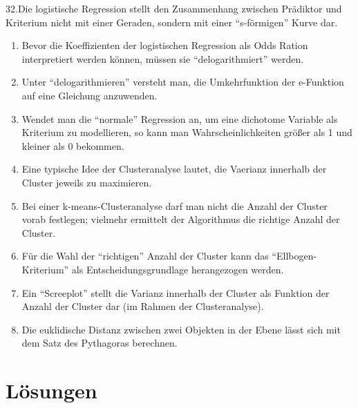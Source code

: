 \documentclass[12pt,ngerman,]{book}
\begin{document}
32.Die logistische Regression stellt den Zusammenhang zwischen Prädiktor
und Kriterium nicht mit einer Geraden, sondern mit einer ``s-förmigen''
Kurve dar.

\begin{enumerate}
\def\labelenumi{\arabic{enumi}.}
\setcounter{enumi}{32}
\item
  Bevor die Koeffizienten der logistischen Regression als Odds Ration
  interpretiert werden können, müssen sie ``delogarithmiert'' werden.
\item
  Unter ``delogarithmieren'' versteht man, die Umkehrfunktion der
  e-Funktion auf eine Gleichung anzuwenden.
\item
  Wendet man die ``normale'' Regression an, um eine dichotome Variable
  als Kriterium zu modellieren, so kann man Wahrscheinlichkeiten größer
  als 1 und kleiner als 0 bekommen.
\item
  Eine typische Idee der Clusteranalyse lautet, die Vaerianz innerhalb
  der Cluster jeweils zu maximieren.
\item
  Bei einer k-means-Clusteranalyse darf man nicht die Anzahl der Cluster
  vorab festlegen; vielmehr ermittelt der Algorithmus die richtige
  Anzahl der Cluster.
\item
  Für die Wahl der ``richtigen'' Anzahl der Cluster kann das
  ``Ellbogen-Kriterium'' als Entscheidungsgrundlage herangezogen werden.
\item
  Ein ``Screeplot'' stellt die Varianz innerhalb der Cluster als
  Funktion der Anzahl der Cluster dar (im Rahmen der Clusteranalyse).
\item
  Die euklidische Distanz zwischen zwei Objekten in der Ebene lässt sich
  mit dem Satz des Pythagoras berechnen.
\end{enumerate}

\section{Lösungen}\label{losungen-1}
\end{document}
